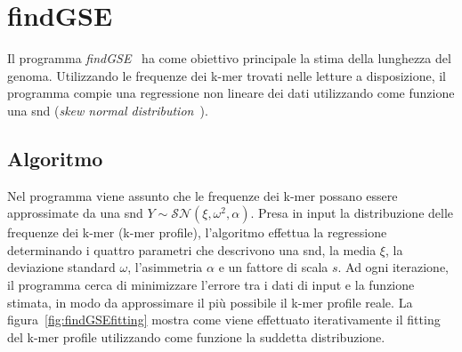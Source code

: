 \documentclass[crop=false, class=book]{standalone}
\begin{document}
	\section{findGSE}
	\label{sec:findGSE}
	Il programma \textit{findGSE}~\cite{sun2017findGSE} ha come obiettivo principale la stima della lunghezza del genoma. Utilizzando le frequenze dei k-mer trovati nelle letture a disposizione, il programma compie una regressione non lineare dei dati utilizzando come funzione una \gls{snd} (\textit{skew normal distribution}~\cite{azzalini1985class,azzalini2005skew}).
	
	\subsection{Algoritmo}
	Nel programma viene assunto che le frequenze dei k-mer possano essere approssimate da una \gls{snd} $Y \sim \mathcal{SN}(\xi, \omega^2, \alpha)$. Presa in input la distribuzione delle frequenze dei k-mer (k-mer profile), l'algoritmo effettua la regressione determinando i quattro parametri che descrivono una \gls{snd}, la media $\xi$, la deviazione standard $\omega$, l'asimmetria $\alpha$ e un fattore di scala $s$. Ad ogni iterazione, il programma cerca di minimizzare l'errore tra i dati di input e la funzione stimata, in modo da approssimare il più possibile il k-mer profile reale. La figura~\vref{fig:findGSEfitting} mostra come viene effettuato iterativamente il \gls{fitting} del k-mer profile utilizzando come funzione la suddetta distribuzione.
	
\end{document}
